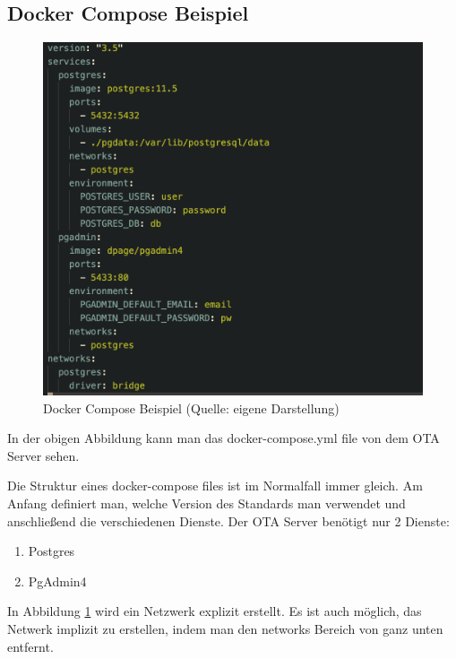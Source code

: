 \subsection{Docker Compose Beispiel}

\begin{figure}[H]
    \begin{center}
        \includegraphics[scale=0.8]{images/docker_compose_example.png}
        \caption{Docker Compose Beispiel (Quelle: eigene Darstellung)}
        \label{abb:docker-compose-example}
    \end{center}
\end{figure}

In der obigen Abbildung kann man das docker-compose.yml file von dem OTA Server sehen.

Die Struktur eines docker-compose files ist im Normalfall immer gleich. Am Anfang definiert man, welche Version des Standards man verwendet und anschließend die verschiedenen Dienste. Der OTA Server benötigt nur 2 Dienste:

\begin{enumerate}
    \item Postgres
    \item PgAdmin4
\end{enumerate}
\pagebreak

In Abbildung \ref{abb:docker-compose-example} wird ein Netzwerk explizit erstellt. Es ist auch möglich, das Netwerk implizit zu erstellen, indem man den networks Bereich von ganz unten entfernt.

